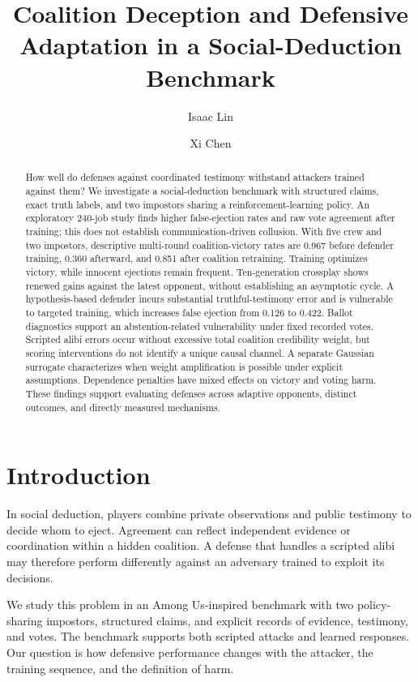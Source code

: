 \documentclass[
  12pt,
]{article}
\title{Coalition Deception and Defensive Adaptation in a
Social-Deduction Benchmark}
\author{Isaac Lin \and Xi Chen}
\date{}
\begin{document}
\maketitle
\begin{abstract}
How well do defenses against coordinated testimony withstand attackers
trained against them? We investigate a social-deduction benchmark with
structured claims, exact truth labels, and two impostors sharing a
reinforcement-learning policy. An exploratory 240-job study finds higher
false-ejection rates and raw vote agreement after training; this does
not establish communication-driven collusion. With five crew and two
impostors, descriptive multi-round coalition-victory rates are 0.967
before defender training, 0.360 afterward, and 0.851 after coalition
retraining. Training optimizes victory, while innocent ejections remain
frequent. Ten-generation crossplay shows renewed gains against the
latest opponent, without establishing an asymptotic cycle. A
hypothesis-based defender incurs substantial truthful-testimony error
and is vulnerable to targeted training, which increases false ejection
from 0.126 to 0.422. Ballot diagnostics support an abstention-related
vulnerability under fixed recorded votes. Scripted alibi errors occur
without excessive total coalition credibility weight, but scoring
interventions do not identify a unique causal channel. A separate
Gaussian surrogate characterizes when weight amplification is possible
under explicit assumptions. Dependence penalties have mixed effects on
victory and voting harm. These findings support evaluating defenses
across adaptive opponents, distinct outcomes, and directly measured
mechanisms.
\end{abstract}

\FloatBarrier

\section{Introduction}\label{introduction}

In social deduction, players combine private observations and public
testimony to decide whom to eject. Agreement can reflect independent
evidence or coordination within a hidden coalition. A defense that
handles a scripted alibi may therefore perform differently against an
adversary trained to exploit its decisions.

We study this problem in an Among Us-inspired benchmark with two
policy-sharing impostors, structured claims, and explicit records of
evidence, testimony, and votes. The benchmark supports both scripted
attacks and learned responses. Our question is how defensive performance
changes with the attacker, the training sequence, and the definition of
harm.
\end{document}
